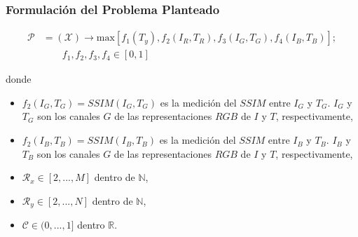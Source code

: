 \documentclass[usenames,dvipsnames]{beamer}
\begin{document}
\begin{frame}
\frametitle{Formulación del Problema Planteado} 

\begin{equation}
\begin{split}
\mathscr{P} &= (\mathscr{X}) \longrightarrow \text{max}[f_1(T_y),f_2(I_R,T_R),f_3(I_G,T_G),f_4(I_B,T_B)]; \\
            & \qquad f_1,f_2,f_3,f_4 \in [0,1]
\end{split}
\end{equation}


donde

\begin{itemize}
	\item $f_2(I_G\label{symbol:ioriginalg},T_G\label{symbol:imejoradag})=SSIM(I_G,T_G)$ es la medición del $SSIM$ entre $I_G$ y $T_G$. $I_G$ y $T_G$ son los canales $G$ de las representaciones $RGB$ de $I$ y $T$, respectivamente,
	\item $f_2(I_B\label{symbol:ioriginalb},T_B\label{symbol:imejoradab})=SSIM(I_B,T_B)$ es la medición del $SSIM$ entre $I_B$ y $T_B$. $I_B$ y $T_B$ son los canales $G$ de las representaciones $RGB$ de $I$ y $T$, respectivamente,
\end{itemize}


\begin{itemize}
	\item $\mathscr{R}_x \in [2,...,M]$ dentro de $\mathbb{N}$,
	\item $\mathscr{R}_y \in [2,...,N]$ dentro de $\mathbb{N}$,
	\item $\mathscr{C} \in (0,...,1]$ dentro $\mathbb{R}$.
\end{itemize}


\end{frame}

\end{document}

